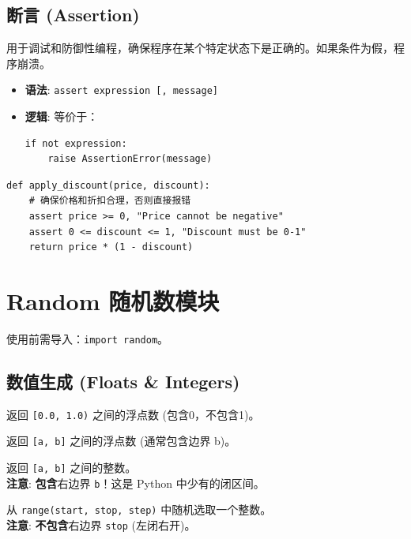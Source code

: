 \documentclass[12pt, a4paper]{article}
\begin{document}
\subsection{断言 (Assertion)}

用于调试和防御性编程，确保程序在某个特定状态下是正确的。如果条件为假，程序崩溃。

\begin{itemize}
    \item \textbf{语法}: \texttt{assert expression [, message]}
    \item \textbf{逻辑}: 等价于：
    \begin{lstlisting}[numbers=none]
if not expression:
    raise AssertionError(message)
    \end{lstlisting}
\end{itemize}

\begin{lstlisting}[caption={Assert 使用示例}]
def apply_discount(price, discount):
    # 确保价格和折扣合理，否则直接报错
    assert price >= 0, "Price cannot be negative"
    assert 0 <= discount <= 1, "Discount must be 0-1"
    return price * (1 - discount)
\end{lstlisting}

\section{Random 随机数模块}

使用前需导入：\texttt{import random}。

\subsection{数值生成 (Floats \& Integers)}

\begin{description}[style=multiline, leftmargin=4cm]
    \item[.random()] 
    返回 \texttt{[0.0, 1.0)} 之间的浮点数 (包含0，不包含1)。
    
    \item[.uniform(a, b)] 
    返回 \texttt{[a, b]} 之间的浮点数 (通常包含边界 b)。
    
    \item[.randint(a, b)] 
    返回 \texttt{[a, b]} 之间的整数。
    \\ \textbf{注意}: \textbf{包含}右边界 \texttt{b}！这是 Python 中少有的闭区间。
    
    \item[.randrange] 
    从 \texttt{range(start, stop, step)} 中随机选取一个整数。
    \\ \textbf{注意}: \textbf{不包含}右边界 \texttt{stop} (左闭右开)。
\end{description}
\end{document}
